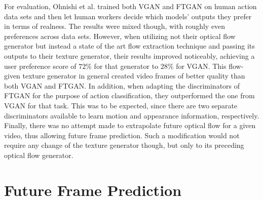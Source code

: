 For evaluation, Ohnishi et al. trained both VGAN and FTGAN on human action data sets and then let human workers decide which models' outputs they prefer in terms of realness. The results were mixed though, with roughly even preferences across data sets. However, when utilizing not their optical flow generator but instead a state of the art flow extraction technique \cite{revaud2015epicflow} and passing its outputs to their texture generator, their results improved noticeably, achieving a user preference score of $72\%$ for that generator to $28\%$ for VGAN. This flow-given texture generator in general created video frames of better quality than both VGAN and FTGAN. In addition, when adapting the discriminators of FTGAN for the purpose of action classification, they outperformed the one from VGAN for that task. This was to be expected, since there are two separate discriminators available to learn motion and appearance information, respectively. Finally, there was no attempt made to extrapolate future optical flow for a given video, thus allowing future frame prediction. Such a modification would not require any change of the texture generator though, but only to its preceding optical flow generator.

\section{Future Frame Prediction} \label{sec:rel_frame_prediction}

